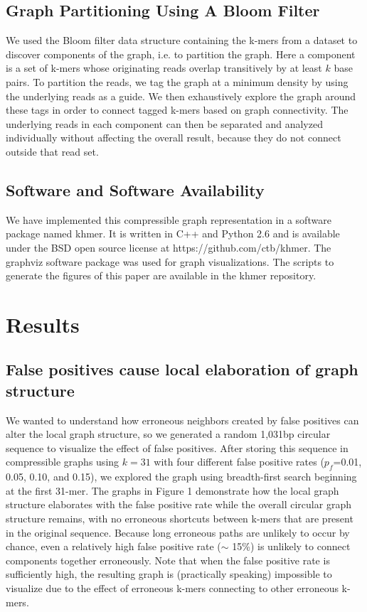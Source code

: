 \documentclass[12pt]{article} \usepackage{simplemargins}
\begin{document}
\subsection{Graph Partitioning Using A Bloom Filter}
We used the Bloom filter data structure containing the k-mers from a
dataset to discover components of the graph, i.e. to
partition the graph.  Here a component is a set of k-mers
whose originating reads overlap transitively by at least $k$ base
pairs.  To partition the reads, we tag the graph at a minimum density
by using the underlying reads as a guide. We then exhaustively explore
the graph around these tags in order to connect tagged k-mers based on
graph connectivity.  The underlying reads in each component
can then be separated and analyzed individually without affecting the
overall result, because they do not connect outside that read set.


\subsection{Software and Software Availability}

We have implemented this compressible graph representation in a
software package named khmer.  It is written in C++ and Python 2.6 and
is available under the BSD open source license at
https://github.com/ctb/khmer.  The graphviz software package was used
for graph visualizations. The scripts to generate the figures of this
paper are available in the khmer repository.

\section{Results}

\subsection{False positives cause local elaboration of graph structure}

We wanted to understand how erroneous neighbors created by false
positives can alter the local graph structure, so we 
generated a random 1,031bp circular sequence to visualize the effect of false
positives.  After storing this sequence in compressible graphs using
$k=31$ with four different false positive rates ($p_f$=0.01, 0.05,
0.10, and 0.15), we explored the graph using breadth-first search
beginning at the first 31-mer.  The graphs in Figure 1 demonstrate how
the local graph structure elaborates with the false positive rate
while the overall circular graph structure remains, with no erroneous
shortcuts between k-mers that are present in the original
sequence. Because long erroneous paths are unlikely to occur by chance,
even a relatively high false positive rate ($\sim$ 15\%) is unlikely to
connect components together erroneously. Note that when the false
positive rate is sufficiently high, the resulting graph is
(practically speaking) impossible to visualize due to the effect of
erroneous k-mers connecting to other erroneous k-mers.
\end{document}
